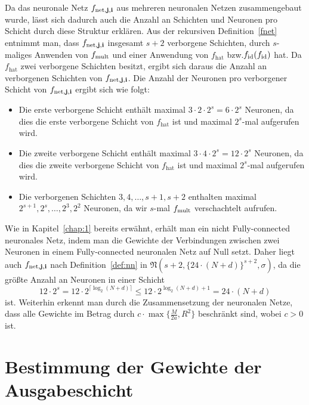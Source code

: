  
Da das neuronale Netz $f_{\mathrm{net},\mathbf{j},\mathbf{i}}$ aus mehreren neuronalen Netzen zusammengebaut wurde, lässt sich dadurch auch die Anzahl an Schichten und Neuronen pro Schicht durch diese Struktur erklären. Aus der rekursiven Definition~\ref{fnet} entnimmt man, dass $f_{\mathrm{net},\mathbf{j},\mathbf{i}}$ insgesamt $s + 2$ verborgene Schichten, durch $s$-maliges Anwenden von $f_{\mathrm{mult}}$ und einer Anwendung von $f_{\mathrm{hat}}$ bzw.\@ $f_{\mathrm{id}}(f_{\mathrm{id}})$ hat. Da $f_{\mathrm{hat}}$ zwei verborgene Schichten besitzt, ergibt sich daraus die Anzahl an verborgenen Schichten von $f_{\mathrm{net},\mathbf{j},\mathbf{i}}$.
Die Anzahl der Neuronen pro verborgener Schicht von $f_{\mathrm{net},\mathbf{j},\mathbf{i}}$ ergibt sich wie folgt:
\begin{itemize}
\item Die erste verborgene Schicht enthält maximal $3 \cdot 2 \cdot 2^s = 6 \cdot 2^s$ Neuronen, da dies die erste verborgene Schicht von $f_{\mathrm{hat}}$ ist und maximal $2^s$-mal aufgerufen wird. 
\item Die zweite verborgene Schicht enthält maximal $3 \cdot 4 \cdot 2^s = 12\cdot 2^s$ Neuronen, da dies die zweite verborgene Schicht von $f_{\mathrm{hat}}$ ist und maximal $2^s$-mal aufgerufen wird.
\item Die verborgenen Schichten $3, 4,\dots, s + 1,s + 2$ enthalten maximal   $2^{s+ 1}, 2^s, \dots, 2^3, 2^2$ Neuronen, da wir $s$-mal $f_{\mathrm{mult}}$ verschachtelt aufrufen. 
\end{itemize}  
Wie in Kapitel~\ref{chap:1} bereits erwähnt, erhält man ein nicht Fully-connected neuronales Netz, indem man die Gewichte der Verbindungen zwischen zwei Neuronen in einem Fully-connected neuronalen Netz auf Null setzt. Daher liegt auch $f_{\mathrm{net},\mathbf{j},\mathbf{i}}$ nach Definition~\ref{def:nn} in $\mathfrak{N}(s + 2,\{24 \cdot (N + d)\}^{s + 2},\sigma)$, da die größte Anzahl an Neuronen in einer Schicht $$12 \cdot 2^s = 12 \cdot 2^{\lceil\log_2(N + d)\rceil} \leq 12 \cdot 2^{\log_2(N + d) + 1} = 24 \cdot (N + d)$$ ist. Weiterhin erkennt man durch die Zusammensetzung der neuronalen Netze, dass alle Gewichte im Betrag durch $c \cdot \max\{\frac{M}{2a}, R^2\}$ beschränkt sind, wobei $c > 0$ ist. 

\section{Bestimmung der Gewichte der Ausgabeschicht}
\label{subsec:2.2}

